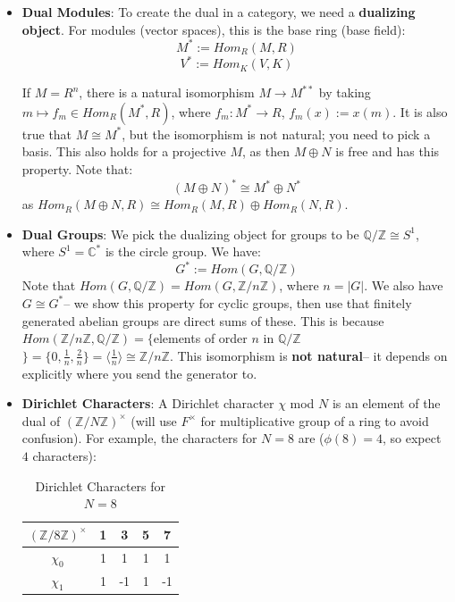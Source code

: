 \documentclass[11pt, oneside]{amsart}   	%
\theoremstyle{definition}
\begin{document}
\begin{itemize}

	\item \textbf{Dual Modules}: To create the dual in a category, we need a \textbf{dualizing object}. For modules (vector spaces), this is the 
	base ring (base field):
	$$
		M^* := Hom_R(M, R)
	$$
	$$
		V^* := Hom_K(V, K)
	$$
	
	If $M = R^n$, there is a natural isomorphism $M\rightarrow M^{**}$ by taking $m\mapsto f_m\in Hom_R(M^*, R)$, where $f_m:M^*\rightarrow R$, 
	$f_m(x) := x(m)$. It is also true that $M\cong M^*$, but the isomorphism is not natural; you need to pick a basis. This also holds for a projective $M$, 
	as then $M\oplus N$ is free and has this property. Note that:
	$$
		(M\oplus N)^*\cong M^*\oplus N^*
	$$
	as $Hom_R(M\oplus N, R)\cong Hom_R(M, R)\oplus Hom_R(N, R)$.
	
	\item \textbf{Dual Groups}: We pick the dualizing object for groups to be $\mathbb Q / \mathbb Z\cong S^1$, where $S^1 = \mathbb C^*$ is the circle 
	group. We have:
	$$
		G^* := Hom(G, \mathbb Q / \mathbb Z)
	$$
	Note that $Hom(G, \mathbb Q / \mathbb Z) = Hom(G, \mathbb Z / n\mathbb Z)$, where $n = |G|$. We also have $G\cong G^*$-- we show this 
	property for cyclic groups, then use that finitely generated abelian groups are direct sums of these. This is because $Hom(\mathbb Z / n\mathbb Z, 
	\mathbb Q / \mathbb Z) = \{$elements of order $n$ in $\mathbb Q / \mathbb Z$ $\} = \{0, \frac{1}{n}, \frac{2}{n}\} = \langle\frac{1}{n}\rangle\cong 
	\mathbb Z / n\mathbb Z$. This isomorphism is \textbf{not natural}-- it depends on explicitly where you send the generator to.
	
	\item \textbf{Dirichlet Characters}: A Dirichlet character $\chi$ mod $N$ is an element of the dual of $(\mathbb Z / N\mathbb Z)^\times$ (will use $F^
	\times$ for multiplicative group of a ring to avoid confusion). For example, the characters for $N = 8$ are ($\phi(8) = 4$, so expect $4$ characters):
	
	\begin{table}[H]
		\centering
		\begin{tabular}{| c | c | c | c | c |}
			\hline
			$(\mathbb Z / 8\mathbb Z)^\times$ & 1 & 3 & 5 & 7 \\
			\hline
			$\chi_0$ & 1 & 1 & 1 & 1 \\
			\hline
			$\chi_1$ & 1 & -1 & 1 & -1 \\
			\hline
		\end{tabular}
		\caption{Dirichlet Characters for $N = 8$}
	\end{table}
	

\end{itemize}
\end{document}
